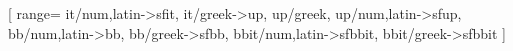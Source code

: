 \RequirePackage{amsmath,amsthm,mathtools}

	\DeclareMathOperator{\sen}{sen}
	\DeclareMathOperator{\tg}{tg}
	\DeclareMathOperator{\cotg}{cotg}
	\DeclareMathOperator{\cosec}{cosec}
	\DeclareMathOperator{\arcsen}{arcsen}
	\DeclareMathOperator{\arctg}{arctg}
	\DeclareMathOperator{\senh}{senh}
	\DeclareMathOperator{\tgh}{tgh}
	\DeclareMathOperator{\mdc}{mdc}
	\DeclareMathOperator{\mmc}{mmc}
	\DeclareMathOperator{\med}{med}
	\DeclareMathOperator{\rad}{rad}
	\DeclareMathOperator{\dirac}{\delta}
	\DeclareMathOperator{\mmu}{\mu}
	\renewcommand{\Im}{\operatorname{Im}}
	\DeclareMathOperator{\D}{D}
	\DeclareMathOperator{\CD}{CD}
	\DeclareMathOperator{\area}{\text{Area}\,}
	\newcommand{\R}{\mathbb{R}}
	\newcommand{\Q}{\mathbb{Q}}
	\newcommand{\Z}{\mathbb{Z}}
	\newcommand{\N}{\mathbb{N}}
	
\RequirePackage{unicode-math}

[
    range={
        it/{num,latin}->sfit,
        it/{greek}->up,
        up/{greek},
        up/{num,latin}->sfup,
        bb/{num,latin}->bb,
        bb/{greek}->sfbb,
        bbit/{num,latin}->sfbbit,
        bbit/{greek}->sfbbit
    }
]
